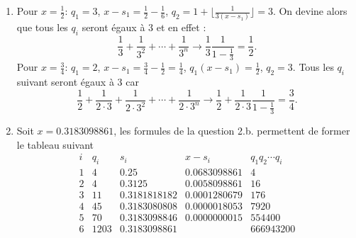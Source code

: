 \begin{enumerate}
\begin{enumerate}
On en tire
\begin{displaymath}
x = \frac{1}{q_1} + \frac{1}{q_1q_2} + \cdots +\frac{x_n}{q_1\cdots q_n}.
\end{displaymath}
Comme la suite $\left( x_n\right)_{n\in \N}$ converge vers $0$, le $x$ de départ est bien la limite d'une suite de Engel. La suite des $q_n$ est croissante car elle est formée avec la partie entière supérieur des inverses de $x_n$. Les $x_n$ décroissent, leurs inverses et leurs parties entières croissent.
 
\item Si $r$ est le reste de la division de $b$ par $a$, notons $p$ le quotient
\begin{multline*}
  b = pa +r \text{ avec } r\in \llbracket 0, a-1\rrbracket \Rightarrow \frac{b}{a} = p + \underset{\in [0,1[}{\underbrace{\frac{r}{a}}}
\Rightarrow p =\lfloor \frac{b}{a} \rfloor \\
\Rightarrow \beta(\frac{a}{b}) = (p+1)x -1 = \left( \frac{b-r}{a} +1\right)\frac{a}{b} -1 = \frac{b-r+a-b}{b} = \frac{a-r}{b} 
\end{multline*}

\item \`A cause de la question 2.a., on doit seulement montrer que le développement de Engel d'un nombre rationnel est stationnaire. D'après la question précédente, $\beta(\frac{a}{b})$ est rationnel avec le même dénominateur mais un numérateur inférieur ou égal. Il ne peut décroitre indéfiniment, on tombe forcément sur un numérateur qui divise le dénominateur et la suite des $x_n$ est alors stationnaire.
\end{enumerate}

\item Pour $x=\frac{1}{2}$: $q_{1}=3$, $x-s_{1}=\frac{1}{2}-\frac{1}{6}$, $q_{2}=1+\lfloor \frac{1}{3(x-s_{1})}\rfloor=3$. On devine alors que tous les $q_{i}$ seront {\'e}gaux {\`a} 3 et en effet :
\[
\frac{1}{3}+\frac{1}{3^{2}}+\cdots +\frac{1}{3^{n}}\rightarrow \frac{1}{3}\frac{1}{1-\frac{1}{3}}=\frac{1}{2}\mathrm{.}
\]
Pour $x=\frac{3}{4}$: $q_{1}=2$, $x-s_{1}=\frac{3}{4}-\frac{1}{2}=\frac{1}{4}$, $q_{1}(x-s_{1})=\frac{1}{2}$, $q_{2}=3$. Tous les $q_{i}$ suivant seront {\'e}gaux {\`a} 3 car
\[
\frac{1}{2}+\frac{1}{2\cdot 3}+\frac{1}{2\cdot 3^{2}}+\cdots +\frac{1}{2\cdot 3^{n}}\rightarrow \frac{1}{2}+\frac{1}{2\cdot 3}\frac{1}{1-\frac{1}{3}}=\frac{3}{4}\mathrm{.}
\]

\item Soit $x=0.3183098861$, les formules de la question 2.b. permettent de former le tableau suivant
\[
\begin{array}{rrrrr}
i & q_{i} & s_{i} & x-s_{i} & q_{1}q_{2}\cdots q_{i} \\
1 & 4 & 0.25 & 0.0683098861 & 4 \\
2 & 4 & 0.3125 & 0.0058098861 & 16 \\
3 & 11 & 0.3181818182 & 0.0001280679 & 176 \\
4 & 45 & 0.3183080808 & 0.0000018053 & 7920 \\
5 & 70 & 0.3183098846 & 0.0000000015 & 554400 \\
6 & 1203 & 0.3183098861 &  & 666943200
\end{array}
\]
\end{enumerate}

